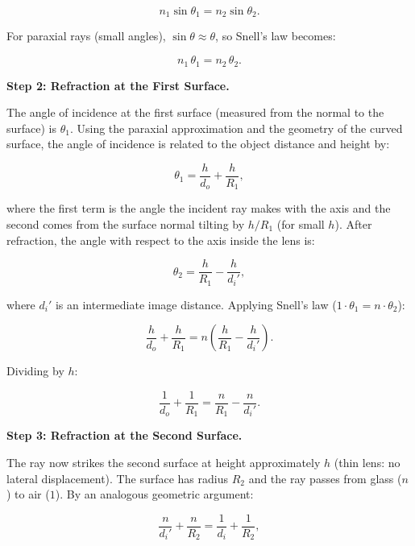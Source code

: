 \begin{equation}
n_1 \sin\theta_1 = n_2 \sin\theta_2.
\end{equation}

For paraxial rays (small angles), $\sin\theta \approx \theta$, so Snell's law becomes:

\begin{equation}
n_1\,\theta_1 = n_2\,\theta_2.
\end{equation}

\textbf{Step 2: Refraction at the First Surface.}

The angle of incidence at the first surface (measured from the normal to the surface) is $\theta_1$. Using the paraxial approximation and the geometry of the curved surface, the angle of incidence is related to the object distance and height by:

\begin{equation}
\theta_1 = \frac{h}{d_o} + \frac{h}{R_1},
\end{equation}

where the first term is the angle the incident ray makes with the axis and the second comes from the surface normal tilting by $h/R_1$ (for small $h$). After refraction, the angle with respect to the axis inside the lens is:

\begin{equation}
\theta_2 = \frac{h}{R_1} - \frac{h}{d_i'},
\end{equation}

where $d_i'$ is an intermediate image distance. Applying Snell's law ($1 \cdot \theta_1 = n \cdot \theta_2$):

\begin{equation}
\frac{h}{d_o} + \frac{h}{R_1} = n\left(\frac{h}{R_1} - \frac{h}{d_i'}\right).
\end{equation}

Dividing by $h$:

\begin{equation}
\frac{1}{d_o} + \frac{1}{R_1} = \frac{n}{R_1} - \frac{n}{d_i'}. \tag{1}
\end{equation}

\textbf{Step 3: Refraction at the Second Surface.}

The ray now strikes the second surface at height approximately $h$ (thin lens: no lateral displacement). The surface has radius $R_2$ and the ray passes from glass ($n$) to air ($1$). By an analogous geometric argument:

\begin{equation}
\frac{n}{d_i'} + \frac{n}{R_2} = \frac{1}{d_i} + \frac{1}{R_2},
\end{equation}


